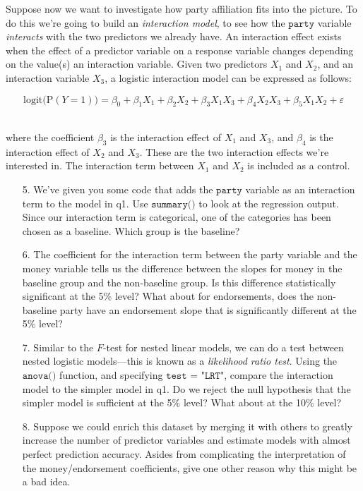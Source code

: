 \documentclass[10pt]{extarticle}
\renewcommand{\P}{\text{P}}
\begin{document}
Suppose now we want to investigate how party affiliation fits into the picture. To do this we're going to build an {\it interaction model}, to see how the $\texttt{party}$ variable {\it interacts} with the two predictors we already have. An interaction effect exists when the effect of a predictor variable on a response variable changes depending on the value(s) an interaction variable. Given two predictors $X_1$ and $X_2$, and an interaction variable $X_3$, a logistic interaction model can be expressed as follows:

$$\text{logit}\big( \P(Y=1) \big) = \beta_0 + \beta_1 X_1 + \beta_2 X_2 + \beta_3 X_1 X_3 + \beta_4 X_2 X_3 + \beta_5 X_1 X_2 + \varepsilon$$ \ 

where the coefficient $\beta_3$ is the interaction effect of $X_1$ and $X_3$, and $\beta_4$ is the interaction effect of $X_2$ and $X_3$. These are the two interaction effects we're interested in. The interaction term between $X_1$ and $X_2$ is included as a control.  \\ 


\begin{itemize}
		
	\item[5.] We've given you some code that adds the $\texttt{party}$ variable as an interaction term to the model in q1. Use $\texttt{summary()}$ to look at the regression output. Since our interaction term is categorical, one of the categories has been chosen as a baseline. Which group is the baseline? \\ 
	
	\item[6.] The coefficient for the interaction term between the party variable and the money variable tells us the difference between the slopes for money in the baseline group and the non-baseline group. Is this difference statistically significant at the 5\% level? What about for endorsements, does the non-baseline party have an endorsement slope that is significantly different at the 5\% level? \\ 
	
	\item[7.] Similar to the $F$-test for nested linear models, we can do a test between nested logistic models---this is known as a {\it likelihood ratio test}. Using the $\texttt{anova()}$ function, and specifying $\texttt{test = "LRT"}$, compare the interaction model to the simpler model in q1. Do we reject the null hypothesis that the simpler model is sufficient at the 5\% level? What about at the 10\% level? \\ 
    
    \item[8.] Suppose we could enrich this dataset by merging it with others to greatly increase the number of predictor variables and estimate models with almost perfect prediction accuracy. Asides from complicating the interpretation of the money/endorsement coefficients, give one other reason why this might be a bad idea. \\ 
    
\end{itemize}
\end{document}
